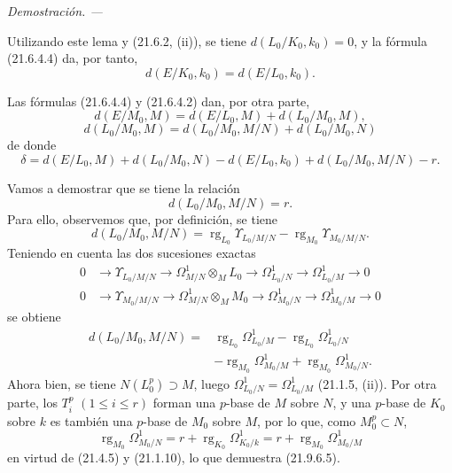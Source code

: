 \documentclass[10pt,oneside]{book}
\newcommand{\oldpage}[2][]{%
  \setcounter{footnote}{0}%
  \marginpar{\scriptsize\textbf{#1}~|~#2}\ignorespaces}
\newenvironment{proof}{%
  \par\medskip\noindent\textit{Demostración. ---\ }}{\par}
\providecommand{\setmin}{-}%
\begin{document}
\begin{proof}
\begin{enumerate}
  Utilizando este lema y (21.6.2, (ii)), se tiene $d(L_0/K_0,k_0)=0$, y la
  fórmula (21.6.4.4) da, por tanto,
  \[
    d(E/K_0,k_0)=d(E/L_0,k_0).
  \]

  \oldpage[0\textsubscript{IV-1}]{180}
  Las fórmulas (21.6.4.4) y (21.6.4.2) dan, por otra parte,
  \[
    d(E/M_0,M)=d(E/L_0,M)+d(L_0/M_0,M),
  \]
  \[
    d(L_0/M_0,M)=d(L_0/M_0,M/N)+d(L_0/M_0,N)
  \]
  de donde
  \[
    \delta=d(E/L_0,M)+d(L_0/M_0,N)\setmin d(E/L_0,k_0)
    +d(L_0/M_0,M/N)\setmin r.
  \]

  Vamos a demostrar que se tiene la relación
  \begin{equation}
  \tag{21.9.6.5}
  \label{0.21.9.6.5-es}
    d(L_0/M_0,M/N)=r.
  \end{equation}
  Para ello, observemos que, por definición, se tiene
  \[
    d(L_0/M_0,M/N)
    =\operatorname{rg}_{L_0}\Upsilon_{L_0/M/N}
    \setmin\operatorname{rg}_{M_0}\Upsilon_{M_0/M/N}.
  \]
  Teniendo en cuenta las dos sucesiones exactas
  \[
  \begin{aligned}
    0&\longrightarrow\Upsilon_{L_0/M/N}
      \longrightarrow\Omega^1_{M/N}\otimes_ML_0
      \longrightarrow\Omega^1_{L_0/N}
      \longrightarrow\Omega^1_{L_0/M}\longrightarrow0\\
    0&\longrightarrow\Upsilon_{M_0/M/N}
      \longrightarrow\Omega^1_{M/N}\otimes_MM_0
      \longrightarrow\Omega^1_{M_0/N}
      \longrightarrow\Omega^1_{M_0/M}\longrightarrow0
  \end{aligned}
  \]
  se obtiene
  \[
  \begin{split}
    d(L_0/M_0,M/N)={}&\operatorname{rg}_{L_0}\Omega^1_{L_0/M}
      \setmin\operatorname{rg}_{L_0}\Omega^1_{L_0/N}\\
      &\setmin\operatorname{rg}_{M_0}\Omega^1_{M_0/M}
      +\operatorname{rg}_{M_0}\Omega^1_{M_0/N}.
  \end{split}
  \]
  Ahora bien, se tiene $N(L_0^p)\supset M$, luego
  $\Omega^1_{L_0/N}=\Omega^1_{L_0/M}$ (21.1.5, (ii)). Por otra parte, los
  $T_i^p$ $(1\leqslant i\leqslant r)$ forman una $p$-base de $M$ sobre $N$,
  y una $p$-base de $K_0$ sobre $k$ es también una $p$-base de $M_0$ sobre
  $M$, por lo que, como $M_0^p\subset N$,
  \[
    \operatorname{rg}_{M_0}\Omega^1_{M_0/N}
    =r+\operatorname{rg}_{K_0}\Omega^1_{K_0/k}
    =r+\operatorname{rg}_{M_0}\Omega^1_{M_0/M}
  \]
  en virtud de (21.4.5) y (21.1.10), lo que demuestra (21.9.6.5).


\end{enumerate}
\end{proof}
\end{document}
